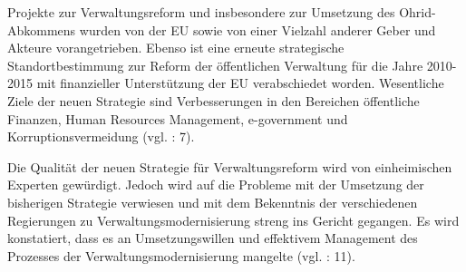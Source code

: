 Projekte zur Verwaltungsreform und insbesondere zur Umsetzung des Ohrid-Abkommens wurden von der EU sowie von einer Vielzahl anderer Geber und Akteure vorangetrieben. Ebenso ist eine erneute strategische Standortbestimmung zur Reform der öffentlichen Verwaltung für die Jahre 2010-2015 mit finanzieller Unterstützung der EU verabschiedet worden. Wesentliche Ziele der neuen Strategie sind Verbesserungen in den Bereichen öffentliche Finanzen, Human Resources Management, e-government und Korruptionsvermeidung (vgl. \cite{dimeski}: 7). \par
Die Qualität der neuen Strategie für Verwaltungsreform wird von einheimischen Experten gewürdigt. Jedoch wird auf die Probleme mit der Umsetzung der bisherigen Strategie verwiesen und mit dem Bekenntnis der verschiedenen Regierungen zu Verwaltungsmodernisierung streng ins Gericht gegangen. Es wird konstatiert, dass es an Umsetzungswillen und effektivem Management des Prozesses der Verwaltungsmodernisierung mangelte (vgl. \cite{dimeski}: 11).

